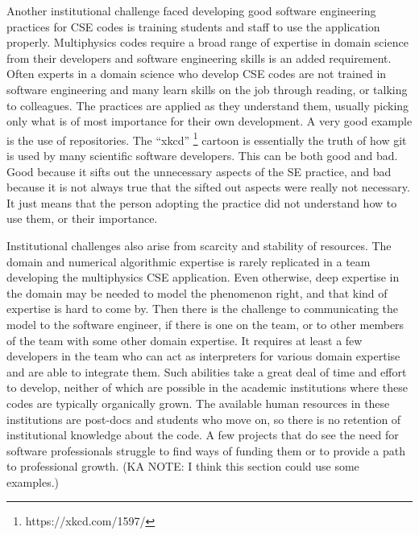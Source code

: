 Another institutional challenge faced developing good software
engineering practices for CSE codes is training students and staff to
use the application properly. Multiphysics codes require a broad range
of expertise in domain science from their developers and software
engineering skills is an added requirement.  Often experts in a domain
science who develop CSE codes are not trained in software engineering
and many learn skills on the job through reading, or talking to
colleagues. The practices are applied as they understand them, usually
picking only what is of most importance for their own development. A
very good example is the use of repositories. The ``xkcd''
\footnote{https://xkcd.com/1597/} cartoon is
essentially the truth of how git is used by many scientific software
developers. 
This can be both good and bad. Good because it sifts out the unnecessary aspects of the SE
practice, and bad because it is not always true that the sifted out
aspects were really not necessary. It just means that the person
adopting the practice did not understand how to use them, or their
importance. 


Institutional challenges also arise from scarcity and stability of
resources. The domain and numerical algorithmic
expertise is rarely replicated in a team developing the multiphysics
CSE application.  Even otherwise, deep expertise in the domain may be
needed to model the phenomenon right, and that kind of expertise is
hard to come by. Then there is the challenge to communicating the
model to the software engineer, if there is one on the team, or to
other members of the team with some other domain expertise. It requires at least a
few developers in the team who can act as interpreters for various
domain expertise and are able to integrate them. Such abilities take a
great deal of time and effort to develop, neither of which are
possible in the academic institutions where these codes are typically
organically grown. The available human resources in these institutions
are post-docs and students who move on, so there is no retention of
institutional knowledge about the code.  A few projects that do see
the need for software professionals struggle to find ways of funding
them or to provide a path to professional growth. (KA NOTE: I think this section could use some examples.)

